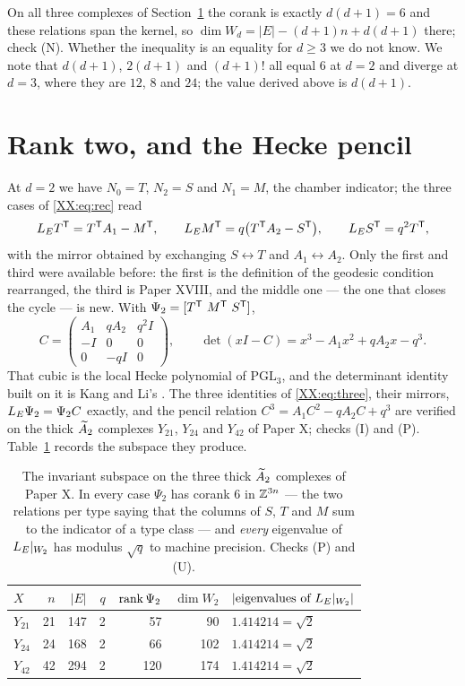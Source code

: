 On all three complexes of Section~\ref{XX:sec:y} the corank is exactly $d(d+1)=6$ and these
relations span the kernel, so $\dim W_d=|E|-(d+1)n+d(d+1)$ there; check (N). Whether the
inequality is an equality for $d\ge3$ we do not know. We note that $d(d+1)$, $2(d+1)$ and
$(d+1)!$ all equal $6$ at $d=2$ and diverge at $d=3$, where they are $12$, $8$ and $24$; the
value derived above is $d(d+1)$.

\section{Rank two, and the Hecke pencil}\label{XX:sec:y}

At $d=2$ we have $N_0=T$, $N_2=S$ and $N_1=M$, the chamber indicator; the three cases of
\eqref{XX:eq:rec} read
\begin{equation}\label{XX:eq:three}
  L_E T^{\mathsf{T}}=T^{\mathsf{T}}A_1-M^{\mathsf{T}},\qquad
  L_E M^{\mathsf{T}}=q\bigl(T^{\mathsf{T}}A_2-S^{\mathsf{T}}\bigr),\qquad
  L_E S^{\mathsf{T}}=q^{2}T^{\mathsf{T}},
\end{equation}
with the mirror obtained by exchanging $S\leftrightarrow T$ and $A_1\leftrightarrow A_2$.
Only the first and third were available before: the first is the definition of the geodesic
condition rearranged, the third is Paper XVIII, and the middle one --- the one that closes
the cycle --- is new. With $\Psi_2=[T^{\mathsf{T}}\ M^{\mathsf{T}}\ S^{\mathsf{T}}]$,
\[
  C=\begin{pmatrix} A_1 & qA_2 & q^{2}I\\ -I & 0 & 0\\ 0 & -qI & 0\end{pmatrix},
  \qquad
  \det(xI-C)=x^{3}-A_1x^{2}+qA_2x-q^{3} .
\]
That cubic is the local Hecke polynomial of $\mathrm{PGL}_3$, and the determinant identity
built on it is Kang and Li's \cite{KL14}. The three identities of \eqref{XX:eq:three}, their
mirrors, $L_E\Psi_2=\Psi_2C$ exactly, and the pencil relation $C^{3}=A_1C^{2}-qA_2C+q^{3}$
are verified on the thick $\widetilde A_{2}$ complexes $Y_{21}$, $Y_{24}$ and $Y_{42}$ of Paper X;
checks (I) and (P). Table~\ref{XX:tab:y} records the subspace they produce.

\begin{table}[t]
\centering
\begin{tabular}{lrrrrrl}
\toprule
$X$ & $n$ & $|E|$ & $q$ & $\operatorname{rank}\Psi_2$ & $\dim W_2$ & $|\text{eigenvalues of }L_E|_{W_2}|$\\
\midrule
$Y_{21}$ & 21 & 147 & 2 &  57 &  90 & $1.414214=\sqrt2$\\
$Y_{24}$ & 24 & 168 & 2 &  66 & 102 & $1.414214=\sqrt2$\\
$Y_{42}$ & 42 & 294 & 2 & 120 & 174 & $1.414214=\sqrt2$\\
\bottomrule
\end{tabular}
\caption{The invariant subspace on the three thick $\widetilde A_{2}$ complexes of Paper X. In every
case $\Psi_2$ has corank $6$ in $\mathbb{Z}^{3n}$ --- the two relations per type saying that the
columns of $S$, $T$ and $M$ sum to the indicator of a type class --- and \emph{every}
eigenvalue of $L_E|_{W_2}$ has modulus $\sqrt q$ to machine precision. Checks (P) and (U).}
\label{XX:tab:y}
\end{table}

